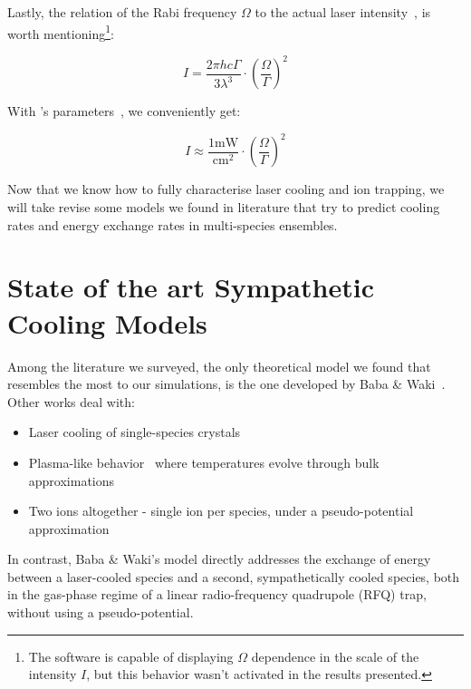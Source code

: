 Lastly, the relation of the Rabi frequency $\Omega$ to the actual laser intensity~\cite{CJFootOmega2I}, is worth mentioning\footnote{The software is capable of displaying $\Omega$ dependence in the scale of the intensity $I$, but this behavior wasn't activated in the results presented.}:

\begin{equation}
    I = \frac{2\pi h c \Gamma}{3 \lambda^3} \cdot \left(\frac{\Omega}{\Gamma}\right)^2
    \label{eq:omega2intensity}
\end{equation}

With 's parameters~\cite{RansfordThesis}, we conveniently get:

\begin{equation}
I \approx \frac{1 \mathrm{mW}}{\mathrm{cm}^2}\cdot \left(\frac{\Omega}{\Gamma}\right)^2
\end{equation}

Now that we know how to fully characterise laser cooling and ion trapping, we will take revise some models we found in literature that try to predict cooling rates and energy exchange rates in multi-species ensembles. 

\section{State of the art Sympathetic Cooling Models}\label{sec:theory/models}

Among the literature we surveyed, the only theoretical model we found that resembles the most to our simulations, is the one developed by Baba \& Waki~\cite{BabaWakiSympatheticCooling}. Other works deal with:

\begin{itemize}
    \item Laser cooling of single-species crystals~\cite{Simple1IonLaserCoolingModel}
    \item Plasma-like behavior~\cite{Plasma2T1,Plasma2T2} where temperatures evolve through bulk approximations
    \item Two ions altogether - single ion per species, under a pseudo-potential approximation~\cite{1CoolingIon1CooledIonModel}
\end{itemize}

In contrast, Baba \& Waki's model directly addresses the exchange of energy between a laser-cooled species and a second, sympathetically cooled species, both in the gas-phase regime of a linear radio-frequency quadrupole (RFQ) trap, without using a pseudo-potential.

